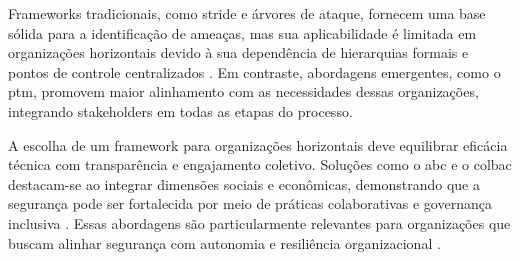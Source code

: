 Frameworks tradicionais, como \gls{stride} e árvores de ataque, fornecem uma
base sólida para a identificação de ameaças, mas sua aplicabilidade é
limitada em organizações horizontais devido à sua dependência de
hierarquias formais e pontos de controle centralizados
\cite{ThreatModelingdesigningForSecurity, AttackTrees}.
Em contraste, abordagens emergentes, como o \gls{ptm},
promovem maior alinhamento com as necessidades dessas organizações,
integrando stakeholders em todas as etapas do processo.

A escolha de um framework para organizações horizontais deve
equilibrar eficácia técnica com transparência e engajamento coletivo.
Soluções como o \gls{abc} e o  \gls{colbac} destacam-se ao integrar dimensões
sociais e econômicas, demonstrando que a segurança pode ser
fortalecida por meio de práticas colaborativas e governança inclusiva
\cite{AbcCrypto, Colbac}.
Essas abordagens são particularmente relevantes para organizações que
buscam alinhar segurança com autonomia e resiliência organizacional \cite{Colbac}.
